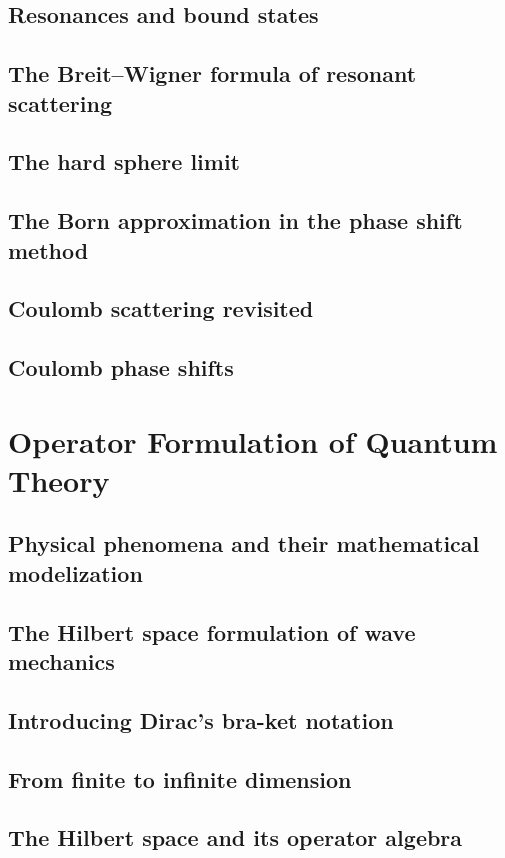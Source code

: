 \documentclass{article}
\begin{document}
\subsection{Resonances and bound states}
\subsection{The Breit–Wigner formula of resonant scattering}
\subsection{The hard sphere limit}
\subsection{The Born approximation in the phase shift method}
\subsection{Coulomb scattering revisited}
\subsection{Coulomb phase shifts}

\section{Operator Formulation of Quantum Theory}
\subsection{Physical phenomena and their mathematical modelization}
\subsection{The Hilbert space formulation of wave mechanics}
\subsection{Introducing Dirac’s bra-ket notation}
\subsection{From finite to infinite dimension}
\subsection{The Hilbert space and its operator algebra}
\end{document}
